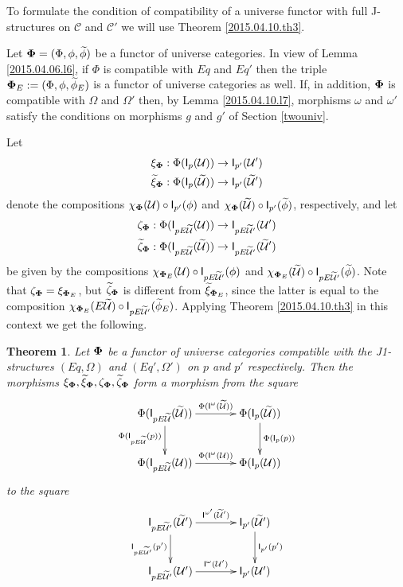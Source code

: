 \documentclass[12pt]{article}
\numberwithin{equation}{section}
\newtheorem{theorem}[proposition]{Theorem}
\newcommand{\sr}{\rightarrow}
\newcommand{\wt}{\widetilde}
\newcommand{\C}{{\mathcal C}}  %
\newcommand{\U}{\mathcal{U}}
\newcommand{\I}{\mathsf{I}}
\begin{document}
To formulate the condition of compatibility of a universe functor with full
J-structures on $\C$ and $\C'$ we will use Theorem
\ref{2015.04.10.th3}.

Let ${\bf\Phi}=(\Phi,\phi,\wt{\phi})$ be a functor of universe categories. In
view of Lemma \ref{2015.04.06.l6}, if $\Phi$ is compatible with $Eq$ and $Eq'$
then the triple ${\bf\Phi}_{E}:=(\Phi,\phi,\wt{\phi}_{E})$ is a functor of
universe categories as well. If, in addition, ${\bf\Phi}$ is compatible with
$\Omega$ and $\Omega'$ then, by Lemma \ref{2015.04.10.l7}, morphisms $\omega$
and $\omega'$ satisfy the conditions on morphisms $g$ and $g'$ of Section
\ref{twouniv}.

Let
%
\begin{align*}
  \xi_{\bf\Phi}&:\Phi(\I_p(\U))\sr \I_{p'}(\U') \\
  \wt{\xi}_{\bf\Phi}&:\Phi(\I_p(\wt{\U}))\sr \I_{p'}(\wt{\U}')
\end{align*}
%
denote the compositions $\chi_{\bf\Phi}(\U)\circ \I_{p'}(\phi)$ and
$\chi_{\bf\Phi}(\wt{\U})\circ \I_{p'}(\wt{\phi})$, respectively, and let
%
\begin{align*}
  \zeta_{\bf\Phi}&:\Phi(\I_{pE\wt{\U}}(\U))\sr \I_{pE\wt{\U}'}(\U') \\
  \wt{\zeta}_{\bf\Phi}&:\Phi(\I_{pE\wt{\U}}(\wt{\U}))\sr \I_{pE\wt{\U}'}(\wt{\U}')
\end{align*}
%
be given by the compositions $\chi_{{\bf\Phi}_{E}}(\U)\circ \I_{pE\wt{\U}'}(\phi)$
and $\chi_{{\bf\Phi}_{E}}(\wt{\U})\circ \I_{pE\wt{\U}'}(\wt{\phi})$. Note that
$\zeta_{\bf\Phi}=\xi_{{\bf\Phi}_{E}}$, but $\wt{\zeta}_{\bf\Phi}$ is different
from $\wt{\xi}_{{\bf\Phi}_{E}}$, since the latter is equal to the composition
$\chi_{{\bf\Phi}_{E}}(E\wt{\U})\circ \I_{pE\wt{\U}'}(\wt{\phi}_{E})$. Applying
Theorem \ref{2015.04.10.th3} in this context we get the following.
%
\begin{theorem}
\label{2015.04.10.th1} Let ${\bf\Phi}$ be a functor of universe categories
compatible with the J1-structures $(Eq,\Omega)$ and $(Eq',\Omega')$ on $p$ and
$p'$ respectively. Then the morphisms $\xi_{\bf\Phi}, \wt{\xi}_{\bf\Phi},
\zeta_{\bf\Phi}, \wt{\zeta}_{\bf\Phi}$ form a morphism from the square
%
$$
\begin{xy}
          \xymatrix@C=3pc{ \Phi(\I_{pE\wt{\U}}(\wt{\U}))
            \ar[r]^-{\Phi(\I^{\omega}(\wt{\U}))} \ar[d]_{\Phi(\I_{pE\wt{\U}}(p))} &
            \Phi(\I_p(\wt{\U}))\ar[d]^-{\Phi(\I_p(p))}\\ \Phi(\I_{pE\wt{\U}}(\U))
            \ar[r]^-{\Phi(\I^{\omega}(\U))} & \Phi(\I_p(\U)) }
\end{xy}
$$
%
to the square
%
$$
\begin{xy}
          \xymatrix@C=3pc{ \I_{pE\wt{\U}'}(\wt{\U}')
            \ar[r]^-{\I^{\omega'}(\wt{\U}')} \ar[d]_-{\I_{pE\wt{\U}'}(p')} &
            \I_{p'}(\wt{\U}')\ar[d]^-{\I_{p'}(p')}\\ \I_{pE\wt{\U}'}(\U')
            \ar[r]^-{\I^{\omega}(\U')} & \I_{p'}(\U') }
\end{xy}
$$
%
\end{theorem}
\end{document}
